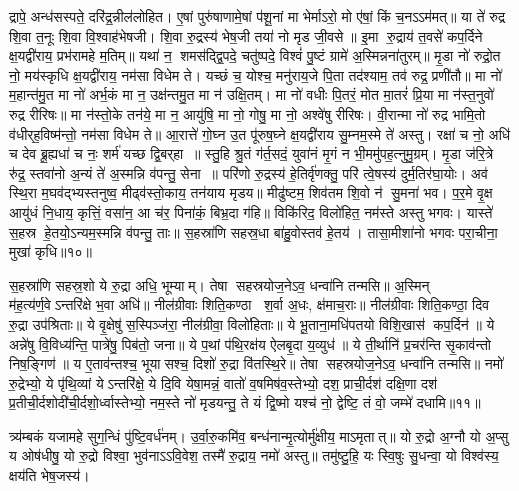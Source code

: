 द्रापे॒ अन्ध॑सस्पते॒ दरि॑द्र॒न्नील॑लोहित। ए॒षां पुरु॑षाणामे॒षां प॑शू॒नां मा भेर्माऽरो॒ मो ए॑षां॒ किं च॒नऽऽम॑मत्॥ या ते॑ रुद्र शि॒वा त॒नूः शि॒वा वि॒श्वाह॑भेषजी। शि॒वा रु॒द्रस्य॑ भेष॒जी तया॑ नो मृड जी॒वसे॥ इ॒मा रु॒द्राय॑ त॒वसे॑ कप॒र्दिने क्ष॒यद्वी॑राय॒ प्रभ॑रामहे म॒तिम्॥ यथा॑ न॒ शमस॑द्द्वि॒पदे॒ चतु॑ष्पदे॒ विश्वं॑ पु॒ष्टं ग्रामे॑ अ॒स्मिन्नना॑तुरम्॥ मृ॒डा नो॑ रुद्रो॒त नो॒ मय॑स्कृधि क्ष॒यद्वी॑राय॒ नम॑सा विधेम ते। यच्छं च॒ योश्च॒ मनु॑राय॒जे पि॒ता तद॑श्याम॒ तव॑ रुद्र॒ प्रणी॑तौ॥ मा नो॑ म॒हान्त॑मु॒त मा नो॑ अर्भ॒कं मा न॒ उक्ष॑न्तमु॒त मा न॑ उक्षि॒तम्। मा नो॑ वधीः पि॒तरं॒ मोत मा॒तरं॑ प्रि॒या मा न॑स्त॒नुवो॑ रुद्र रीरिषः॥ मा न॑स्तो॒के तन॑ये॒ मा न॒ आयु॑षि॒ मा नो॒ गोषु॒ मा नो॒ अश्वे॑षु रीरिषः। वी॒रान्मा नो॑ रुद्र भामि॒तो व॑धीर्‌ह॒विष्म॑न्तो॒ नम॑सा विधेम ते॥ आ॒रात्ते॑ गो॒घ्न उ॒त पू॑रुष॒घ्ने क्ष॒यद्वी॑राय सु॒म्नम॒स्मे ते॑ अस्तु। रक्षा॑ च नो॒ अधि॑ च देव ब्रू॒ह्यधा॑ च नः॒ शर्म॑ यच्छ द्वि॒बर्‌हा॥ स्तु॒हि श्रु॒तं ग॑र्त॒सदं॒ युवा॑नं मृ॒गं न भी॒ममु॑पह॒त्नुमु॒ग्रम्। मृ॒डा ज॑रि॒त्रे रु॑द्र॒ स्तवा॑नो अ॒न्यं ते॑ अ॒स्मन्नि व॑पन्तु॒ सेना॥ परि॑णो रु॒द्रस्य॑ हे॒तिर्वृ॑णक्तु॒ परि॑ त्वे॒षस्य॑ दुर्म॒तिर॑घा॒योः। अव॑ स्थि॒रा म॒घव॑द्भ्यस्तनुष्व॒ मीढ्व॑स्तो॒काय॒ तन॑याय मृडय॥ मीढु॑ष्टम॒ शिव॑तम शि॒वो न॑ सु॒मना॑ भव। प॒र॒मे वृ॒क्ष आयु॑धं नि॒धाय॒ कृत्तिं॒ वसा॑न॒ आ च॑र॒ पिना॑कं॒ बिभ्र॒दा ग॑हि॥ विकि॑रिद॒ विलो॑हित॒ नम॑स्ते अस्तु भगवः। यास्ते॑ स॒हस्र हे॒तयो॒ऽन्यम॒स्मन्नि व॑पन्तु॒ ताः॥ स॒हस्रा॑णि सहस्र॒धा बा॑हु॒वोस्तव॑ हे॒तय॑। तासा॒मीशा॑नो भगवः परा॒चीना॒ मुखा॑ कृधि॥१०॥

स॒हस्रा॑णि सहस्र॒शो ये रु॒द्रा अधि॒ भूम्याम्। तेषा सहस्रयोज॒नेऽव॒ धन्वा॑नि तन्मसि॥ अ॒स्मिन् म॑ह॒त्य॑र्ण॒वेऽन्तरि॑क्षे भ॒वा अधि॑॥ नील॑ग्रीवाः शिति॒कण्ठा श॒र्वा अ॒धः, क्ष॑माच॒राः॥ नील॑ग्रीवाः शिति॒कण्ठा॒ दिव रु॒द्रा उप॑श्रिताः॥ ये वृ॒क्षेषु॑ स॒स्पिञ्ज॑रा॒ नील॑ग्रीवा॒ विलो॑हिताः॥ ये भू॒ताना॒मधि॑पतयो विशि॒खास॑ कप॒र्दिन॑॥ ये अन्ने॑षु वि॒विध्य॑न्ति॒ पात्रे॑षु॒ पिब॑तो॒ जना\sn ॥ ये प॒थां प॑थि॒रक्ष॑य ऐलबृ॒दा य॒व्युध॑॥ ये ती॒र्थानि॑ प्र॒चर॑न्ति सृ॒काव॑न्तो निष॒ङ्गिण॑॥ य ए॒ताव॑न्तश्च॒ भूयासश्च॒ दिशो॑ रु॒द्रा वि॑तस्थि॒रे॥ तेषा सहस्रयोज॒नेऽव॒ धन्वा॑नि तन्मसि॥ नमो॑ रु॒द्रेभ्यो॒ ये पृ॑थि॒व्यां येऽन्तरि॑क्षे॒ ये दि॒वि येषा॒मन्नं॒ वातो॑ व॒\ar षमिष॑व॒स्तेभ्यो॒ दश॒ प्राची॒र्दश॑ दक्षि॒णा दश॑ प्र॒तीची॒र्दशो\-दी॑ची॒र्दशो॒र्ध्वास्तेभ्यो॒ नम॒स्ते नो॑ मृडयन्तु॒ ते यं द्वि॒ष्मो यश्च॑ नो॒ द्वेष्टि॒ तं वो॒ जम्भे॑ दधामि॥११॥ 

\lbrack त्र्य॑म्बकं यजामहे सुग॒न्धिं पु॑ष्टि॒वर्ध॑नम्। उ॒र्वा॒रु॒कमि॑व॒ बन्ध॑नान्मृ॒त्योर्मु॑क्षीय॒ माऽमृतात्॥ यो रु॒द्रो अ॒ग्नौ यो अ॒प्सु य ओष॑धीषु॒ यो रु॒द्रो विश्वा॒ भुव॑नाऽऽवि॒वेश॒ तस्मै॑ रु॒द्राय॒ नमो॑ अस्तु॥ तमु॑ष्टु॒हि॒ यः स्वि॒षुः सु॒धन्वा॒ यो विश्व॑स्य॒ क्षय॑ति भेष॒जस्य॑। 

